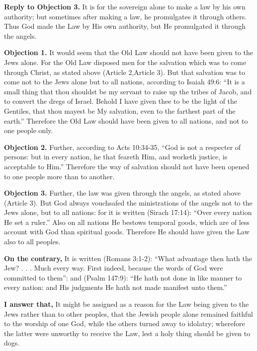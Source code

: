 \textbf{Reply to Objection 3.} It is for the sovereign alone to make a law by his own authority; but sometimes after making a law, he promulgates it through others. Thus God made the Law by His own authority, but He promulgated it through the angels.


\textbf{Objection 1.} It would seem that the Old Law should not have been given to the Jews alone. For the Old Law disposed men for the salvation which was to come through Christ, as stated above (Article 2,Article 3). But that salvation was to come not to the Jews alone but to all nations, according to Isaiah 49:6: ``It is a small thing that thou shouldst be my servant to raise up the tribes of Jacob, and to convert the dregs of Israel. Behold I have given thee to be the light of the Gentiles, that thou mayest be My salvation, even to the farthest part of the earth.'' Therefore the Old Law should have been given to all nations, and not to one people only.

\textbf{Objection 2.} Further, according to Acts 10:34-35, ``God is not a respecter of persons: but in every nation, he that feareth Him, and worketh justice, is acceptable to Him.'' Therefore the way of salvation should not have been opened to one people more than to another.

\textbf{Objection 3.} Further, the law was given through the angels, as stated above (Article 3). But God always vouchsafed the ministrations of the angels not to the Jews alone, but to all nations: for it is written (Sirach 17:14): ``Over every nation He set a ruler.'' Also on all nations He bestows temporal goods, which are of less account with God than spiritual goods. Therefore He should have given the Law also to all peoples.

\textbf{On the contrary,} It is written (Romans 3:1-2): ``What advantage then hath the Jew? . . . Much every way. First indeed, because the words of God were committed to them'': and (Psalm 147:9): ``He hath not done in like manner to every nation: and His judgments He hath not made manifest unto them.''

\textbf{I answer that,} It might be assigned as a reason for the Law being given to the Jews rather than to other peoples, that the Jewish people alone remained faithful to the worship of one God, while the others turned away to idolatry; wherefore the latter were unworthy to receive the Law, lest a holy thing should be given to dogs.

